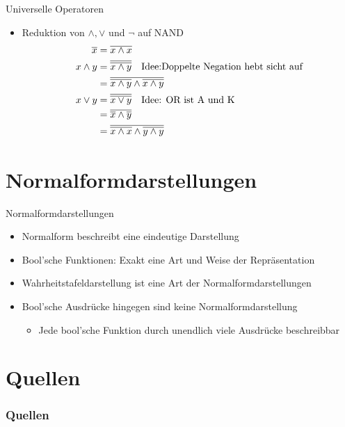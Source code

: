 \documentclass[12pt%
,aspectratio=169%
]{beamer}
\begin{document}
\begin{frame}{Universelle Operatoren}
\begin{itemize}
	\item Reduktion von $\land, \lor$ und $\neg$ auf NAND
	\begin{align*}
		\overline{x} &= \overline{x \land x}\\
		x \land y &= \overline{\overline{x \land y}} \text{\quad Idee:Doppelte Negation hebt sicht auf}\\
		&= \overline{\overline{x \land y} \land \overline{x \land y}}\\
		x \lor y &= \overline{\overline{x \lor y}} \text{\quad Idee: OR ist A und K} \\
		&= \overline{\overline{x} \land \overline{y}}\\
		&= \overline{\overline{x \land x} \land \overline{y \land y}}
	\end{align*}
\end{itemize}
\end{frame}

\section{Normalformdarstellungen}
\begin{frame}{Normalformdarstellungen}
\begin{itemize}
	\item Normalform beschreibt eine eindeutige Darstellung
	\item Bool'sche Funktionen: Exakt eine Art und Weise der Repräsentation
	\item Wahrheitstafeldarstellung ist eine Art der Normalformdarstellungen
	\item Bool'sche Ausdrücke hingegen sind keine Normalformdarstellung
	\begin{itemize}
		\item Jede bool'sche Funktion durch unendlich viele Ausdrücke beschreibbar
	\end{itemize}
\end{itemize}
\end{frame}






\section*{Quellen}
\appendix
\begin{frame}[allowframebreaks]
  \frametitle<presentation>{Quellen}
\printbibliography
\end{frame}
\end{document}
